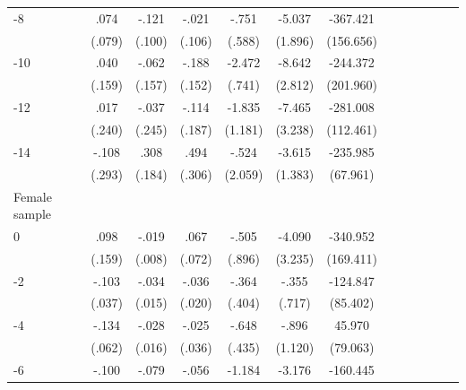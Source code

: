 \begin{table}[hp]
\begin{adjustbox}{max width=\linewidth}
\begin{threeparttable}
{\begin{tabular}{l*{6}{S S}}
-8             &     .074         &    -.121         &    -.021         &    -.751         &   -5.037\sym{***}& -367.421\sym{**} \\
                &   (.079)         &   (.100)         &   (.106)         &   (.588)         &  (1.896)         &(156.656)         \\
-10            &     .040         &    -.062         &    -.188         &   -2.472\sym{***}&   -8.642\sym{***}& -244.372         \\
                &   (.159)         &   (.157)         &   (.152)         &   (.741)         &  (2.812)         &(201.960)         \\
-12           &     .017         &    -.037         &    -.114         &   -1.835         &   -7.465\sym{**} & -281.008\sym{**} \\
                &   (.240)         &   (.245)         &   (.187)         &  (1.181)         &  (3.238)         &(112.461)         \\
-14           &    -.108         &     .308\sym{*}  &     .494         &    -.524         &   -3.615\sym{***}& -235.985\sym{***}\\
                &   (.293)         &   (.184)         &   (.306)         &  (2.059)         &  (1.383)         & (67.961)         \\
\midrule
Female sample &&&&&&\\
0               &     .098         &    -.019\sym{**} &     .067         &    -.505         &   -4.090         & -340.952\sym{**} \\
                &   (.159)         &   (.008)         &   (.072)         &   (.896)         &  (3.235)         &(169.411)         \\
-2             &    -.103\sym{***}&    -.034\sym{**} &    -.036\sym{*}  &    -.364         &    -.355         & -124.847         \\
                &   (.037)         &   (.015)         &   (.020)         &   (.404)         &   (.717)         & (85.402)         \\
-4             &    -.134\sym{**} &    -.028\sym{*}  &    -.025         &    -.648         &    -.896         &   45.970         \\
                &   (.062)         &   (.016)         &   (.036)         &   (.435)         &  (1.120)         & (79.063)         \\
-6             &    -.100         &    -.079\sym{*}  &    -.056\sym{*}  &   -1.184\sym{***}&   -3.176\sym{***}& -160.445\sym{*}  \\

\end{tabular}}
\end{threeparttable}
\end{adjustbox}
\end{table}
